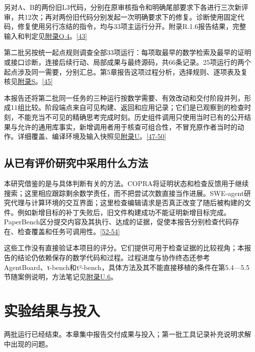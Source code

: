 另对A、B的两份旧L3代码，分别在原审核指令和明确尾部要求下各进行三次新评审，共12次；再对两份旧代码分别发起一次明确要求下的修复。诊断使用固定代码，修复使用另行冻结的指令，均与33项主运行分开。附录R.1.6报告结果，完整输入和判定见\href{zh-appendix.pdf\#q4}{附录Q.4}。\hyperlink{ref-43}{\mbox{[43]}}

第二批另按统一起点规则调查全部33项运行：每项取最早的数学检索及最早的证明或接口诊断，连接后续行动、局部成果与最终源码，共66条记录。25项运行的两个起点涉及同一需要，分别汇总。第5章报告这项过程分析，选择规则、逐项表及复核见\href{zh-appendix.pdf\#appendix-s}{附录S}。\hyperlink{ref-45}{\mbox{[45]}}

本报告还将第二批同一任务的三种运行按数学需要、有效改动和交付阶段并列，形成11组比较。阶段端点来自可见构建、返回和应用记录；它们是已观察到的检查时刻，不能充当不可见的精确思考完成时刻。历史组件调用只使用当时已有的公开结果与允许的通用库事实，新增调用者用于核查可组合性，不冒充原作者当时的动作。详细覆盖、编译环境及输入快照见\href{zh-appendix.pdf\#appendix-u}{附录U}。\hyperlink{ref-47}{\mbox{[47-50]}}

\subsection[从已有评价研究中采用什么方法]{\texorpdfstring{\protect\hypertarget{section-2-6}{}从已有评价研究中采用什么方法}{从已有评价研究中采用什么方法}}
本研究借鉴的是与具体判断有关的方法。COPRA将证明状态和检查反馈用于继续搜索；这里相应跟踪剩余数学责任，而不把尝试次数直接当作进展。SWE-agent研究代理与计算环境的交互界面；这里检查编辑请求是否真正改变了随后被构建的文件。例如新增目标的补丁失败后，旧文件构建成功不能证明新增目标完成。PaperBench区分提交内容及其执行、达成的证据，促使本报告分别检查代码存在、检查覆盖和任务可调用性。\hyperlink{ref-52}{\mbox{[52-54]}}

这些工作没有直接验证本项目的评分。它们提供可用于检查证据的比较视角；本报告的结论仍依赖保存的数学代码和过程。过程进度与协作终态还参考AgentBoard、τ-bench和τ²-bench，具体方法及其不能直接移植的条件在第5.4—5.5节随案例说明，方法笔记见\href{zh-appendix.pdf\#u6}{附录U.6}。

\section[实验结果与投入]{\texorpdfstring{\protect\hypertarget{section-3}{}实验结果与投入}{实验结果与投入}}
两批运行已经结束。本章集中报告交付成果与投入；第一批工具记录补充说明求解中出现的问题。

